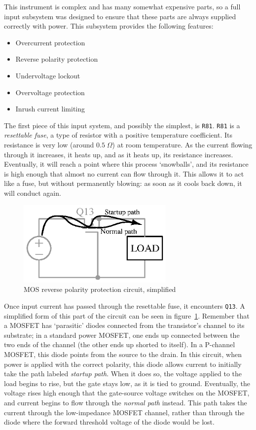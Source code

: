 \documentclass{article}
\newcommand{\refdes}[1]{\texttt{#1}}
\begin{document}
This instrument is complex and has many somewhat expensive parts, so a full
input subsystem was designed to ensure that these parts are always supplied
correctly with power. This subsystem provides the following features:

\begin{itemize}
\item{Overcurrent protection}
\item{Reverse polarity protection}
\item{Undervoltage lockout}
\item{Overvoltage protection}
\item{Inrush current limiting}
\end{itemize}

The first piece of this input system, and possibly the simplest, is
\refdes{R81}. \refdes{R81} is a \emph{resettable fuse}, a type of resistor
with a positive temperature coefficient. Its resistance is very low
(around $0.5\;\Omega$) at room temperature.  As the current flowing through it
increases, it heats up, and as it heats up, its resistance increases.
Eventually, it will reach a point where this process `snowballs', and its
resistance is high enough that almost no current can flow through it. This
allows it to act like a fuse, but without permanently blowing: as soon as it
cools back down, it will conduct again.

\begin{figure}[h]
\centering
\includegraphics[width=3in]{mosrpp}
\caption{MOS reverse polarity protection circuit, simplified}
\label{fig:mosrpp}
\end{figure}

Once input current has passed through the resettable fuse, it encounters
\refdes{Q13}. A simplified form of this part of the circuit can be seen in
figure~\ref{fig:mosrpp}. Remember that a MOSFET has `parasitic' diodes
connected from the transistor's channel to its substrate; in a
standard power MOSFET, one ends up connected between the two ends of the
channel (the other ends up shorted to itself). In a P-channel MOSFET, this
diode points from the source to the drain. In this circuit, when power is
applied with the correct polarity, this diode allows current to initially take
the path labeled \emph{startup path}. When it does so, the voltage applied to
the load begins to rise, but the gate stays low, as it is tied to ground.
Eventually, the voltage rises high enough that the gate-source voltage switches
on the MOSFET, and current begins to flow through the \emph{normal path}
instead. This path takes the current through the low-impedance MOSFET channel,
rather than through the diode where the forward threshold voltage of the diode
would be lost.
\end{document}
